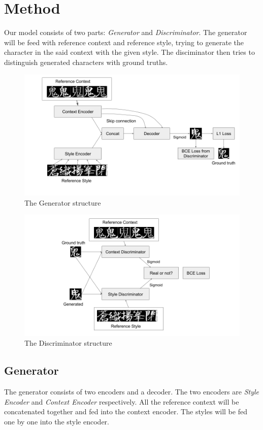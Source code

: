 \documentclass[10pt,twocolumn,letterpaper]{article}
\begin{document}
\section{Method}
Our model consists of two parts: \textit{Generator} and \textit{Discriminator}. The generator will be feed with reference context and reference style, trying to generate the character in the said context with the given style. The disciminator then tries to distinguish generated characters with ground truths.

\begin{figure}
	\begin{center}
		\includegraphics[width=0.8\linewidth]{gen.png}
	\end{center}
	\caption{The Generator structure}
	\label{fig:short}
\end{figure}

\begin{figure}
	\begin{center}
		\includegraphics[width=0.8\linewidth]{dis.png}
	\end{center}
	\caption{The Discriminator structure}
	\label{fig:short}
\end{figure}


\subsection{Generator}
The generator consists of two encoders and a decoder. The two encoders are \textit{Style Encoder} and \textit{Context Encoder} respectively. All the reference context will be concatenated together and fed into the context encoder. The styles will be fed one by one into the style encoder. 
\end{document}
